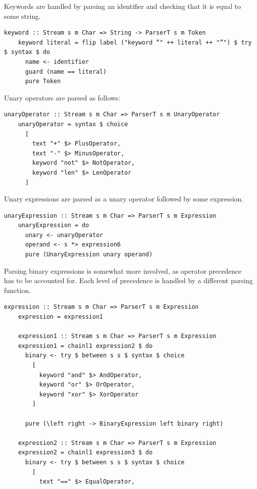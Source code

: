 \documentclass[UdineBachThesis,american,11pt]{PhdThesis}
\begin{document}
  Keywords are handled by parsing an identifier and checking that it is equal to
  some string.

  \begin{lstlisting}[gobble=4,basicstyle=\ttfamily\small]
    keyword :: Stream s m Char => String -> ParserT s m Token
    keyword literal = flip label ("keyword “" ++ literal ++ "”") $ try $ syntax $ do
      name <- identifier
      guard (name == literal)
      pure Token
  \end{lstlisting}

  Unary operators are parsed as follows:

  \begin{lstlisting}[gobble=4,basicstyle=\ttfamily\small]
    unaryOperator :: Stream s m Char => ParserT s m UnaryOperator
    unaryOperator = syntax $ choice
      [
        text "+" $> PlusOperator,
        text "-" $> MinusOperator,
        keyword "not" $> NotOperator,
        keyword "len" $> LenOperator
      ]
  \end{lstlisting}

  Unary expressions are parsed as a unary operator followed by some expression.

  \begin{lstlisting}[gobble=4,basicstyle=\ttfamily\small]
    unaryExpression :: Stream s m Char => ParserT s m Expression
    unaryExpression = do
      unary <- unaryOperator
      operand <- s *> expression6
      pure (UnaryExpression unary operand)
  \end{lstlisting}

  Parsing binary expressions is somewhat more involved, as operator precedence
  has to be accounted for. Each level of precedence is handled by a different
  parsing function.

  \begin{lstlisting}[gobble=4,basicstyle=\ttfamily\small]
    expression :: Stream s m Char => ParserT s m Expression
    expression = expression1

    expression1 :: Stream s m Char => ParserT s m Expression
    expression1 = chainl1 expression2 $ do
      binary <- try $ between s s $ syntax $ choice
        [
          keyword "and" $> AndOperator,
          keyword "or" $> OrOperator,
          keyword "xor" $> XorOperator
        ]

      pure (\left right -> BinaryExpression left binary right)

    expression2 :: Stream s m Char => ParserT s m Expression
    expression2 = chainl1 expression3 $ do
      binary <- try $ between s s $ syntax $ choice
        [
          text "==" $> EqualOperator,
  \end{lstlisting}
\end{document}
